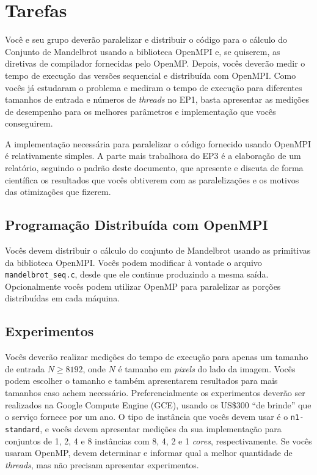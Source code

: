 \documentclass[final,12pt,a4paper]{elsarticle}
\begin{document}
\section{Tarefas}

Você e seu grupo deverão paralelizar e distribuir o código para o cálculo do
Conjunto de Mandelbrot usando a biblioteca OpenMPI e, se quiserem, as diretivas
de compilador fornecidas pelo OpenMP. Depois, vocês deverão medir o tempo de
execução das versões sequencial e distribuída com OpenMPI.  Como vocês já
estudaram o problema e mediram o tempo de execução para diferentes tamanhos de
entrada e números de \textit{threads} no EP1, basta apresentar as medições de
desempenho para os melhores parâmetros e implementação que vocês conseguirem.

A implementação necessária para paralelizar o código fornecido usando OpenMPI é
relativamente simples. A parte mais trabalhosa do EP3 é a elaboração de um
relatório, seguindo o padrão deste documento, que apresente e discuta de forma
científica os resultados que vocês obtiverem com as paralelizações e os motivos
das otimizações que fizerem.

\subsection{Programação Distribuída com OpenMPI}

Vocês devem distribuir o cálculo do conjunto de Mandelbrot usando as primitivas
da biblioteca OpenMPI. Vocês podem modificar à vontade o arquivo
\texttt{mandelbrot\_seq.c}, desde que ele continue produzindo a mesma saída.
Opcionalmente vocês podem utilizar OpenMP para paralelizar as porções
distribuídas em cada máquina.

\subsection{Experimentos}

Vocês deverão realizar medições do tempo de execução para apenas um tamanho de
entrada $N \geq 8192$, onde $N$ é tamanho em \textit{pixels} do lado da imagem.
Vocês podem escolher o tamanho e também apresentarem resultados para mais
tamanhos caso achem necessário.
Preferencialmente os experimentos deverão ser realizados na Google Compute
Engine (GCE), usando os US\$300 ``de brinde'' que o serviço fornece por um ano.
O tipo de instância que vocês devem usar é o \texttt{n1-standard}, e vocês
devem apresentar medições da sua implementação para conjuntos de 1, 2, 4 e 8
instâncias com 8, 4, 2 e 1 \textit{cores}, respectivamente.
Se vocês usaram OpenMP, devem determinar e informar qual a melhor quantidade de
\textit{threads}, mas não precisam apresentar experimentos.
\end{document}

